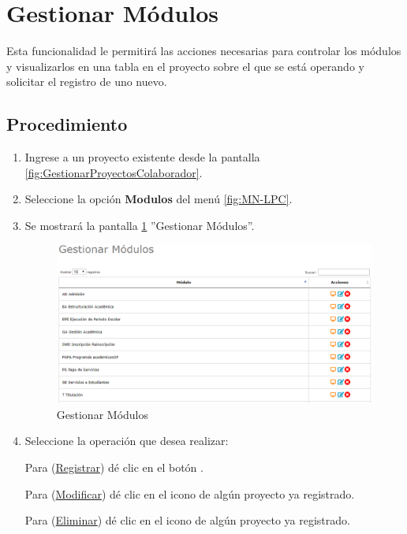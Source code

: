 \hypertarget{cv:GestionarModulos}{\section{Gestionar Módulos}} \label{sec:GestionarModulos}

	Esta funcionalidad le permitirá las acciones necesarias para controlar los módulos y visualizarlos en una tabla en el proyecto sobre el que se está operando y solicitar el registro de uno nuevo.

		\subsection{Procedimiento}

			\begin{enumerate}
				
			\item Ingrese a un proyecto existente desde la pantalla \ref{fig:GestionarProyectosColaborador}.
	
			\item Seleccione la opción \textbf{Modulos} del menú \ref{fig:MN-LPC}.
	
			\item Se mostrará la pantalla \ref{fig:GestionarModulos} ''Gestionar Módulos''.

			\begin{figure}[htbp!]
				\begin{center}
					\includegraphics[scale=0.6]{roles/lider/modulos/pantallas/IU5gestionarModulos}
					\caption{Gestionar Módulos}
					\label{fig:GestionarModulos}
				\end{center}
			\end{figure}
		
				\item Seleccione la operación que desea realizar:
			
			Para (\hyperlink{cv:registrarModulo}{Registrar}) dé clic en el botón \IURegistrar.
			
			Para (\hyperlink{cv:modificarModulo}{Modificar}) dé clic en el icono \IUEditar{} de algún proyecto ya registrado.
			
			Para (\hyperlink{cv:eliminarProyecto}{Eliminar}) dé clic en el icono \IUBotonEliminar{} de algún proyecto ya registrado.
			
			
			\end{enumerate}